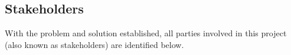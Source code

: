 \subsection{Stakeholders}
\label{sec:stakeholders}
With the problem and solution established, all parties involved in this project (also known as stakeholders) are identified below. 






